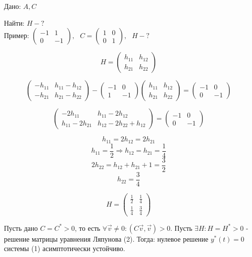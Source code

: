 \documentclass[12pt, a4paper]{report}
\begin{document}
Дано: \( A, C \) 

Найти: \( H - ? \) \\

Пример: \( \begin{pmatrix}
-1 & 1 \\
0 & -1
\end{pmatrix} , \text{ }  C = \begin{pmatrix}
1  & 0\\
0  & 1
\end{pmatrix} , \text{ }  H - ? \) 

\[ H = \begin{pmatrix}
h_{11}   & h_{12}\\ h_{21} & h_{22}
\end{pmatrix} \] 

\[ \begin{pmatrix}
- h_{11} & h_{11} - h_{12}\\
- h_{21} & h_{21} - h_{22}
\end{pmatrix} - \begin{pmatrix}
-1 & 0 \\
1  & -1
\end{pmatrix} \begin{pmatrix}
h_{11} & h_{12}\\
h_{21} & h_{22}
\end{pmatrix} = \begin{pmatrix}
-1 & 0 \\
0 & -1
\end{pmatrix}\] 

\[ \begin{pmatrix}
- 2 h_{11} & h_{11} - 2 h_{12}\\
h_{11} - 2 h_{21} & h_{12} - 2 h_{22} + h_{12}
\end{pmatrix} = \begin{pmatrix}
-1  & 0 \\
0 & -1
\end{pmatrix} \] 

\[ h_{11} = 2h_{12} = 2h_{21}  \] 
\[ h_{11} = \frac{1}{2 }  \Rightarrow h_{12} = h_{21} = \frac{1}{4}  \] 
\[ 2 h_{22} = h_{12} + h_{21} + 1 = \frac{3}{2}  \] 
\[ h_{22} = \frac{3}{4}  \] 

\[ H = \begin{pmatrix}
\frac{1}{2 }  & \frac{1}{4} \\
\frac{1}{4}  & \frac{3}{4} 
\end{pmatrix} \] 

\begin{theorem}
    Пусть дано \( C = C^* > 0\), то есть \( \forall  \vec{v }  \neq  0 : (C \vec{v }  , \vec{v  }  ) > 0   \). Пусть \( \exists H : H = H ^* > 0  \) - решение матрицы уравнения Ляпунова (2). Тогда: нулевое решение \( y^* (t) = 0 \) системы (1) асимптотически устойчиво.
\end{theorem}
\end{document}
